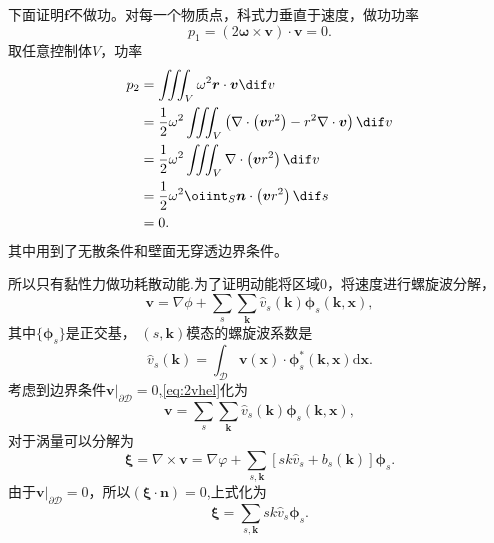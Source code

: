 \documentclass[12pt]{ctexart}
\begin{document}
下面证明$\bm{f}$不做功。对每一个物质点，科式力垂直于速度，做功功率
\begin{equation}
	p_1 = (2 \bm{\omega} \times \bm{v}) \cdot \bm{v} = 0.
\end{equation}
取任意控制体$V$，功率
\begin{equation}
	\begin{aligned}
		p_2 & =  \iiint_V \omega^2\bm{r} \cdot \bm{v} \dif v                                                                          \\
		    & =      \frac{1}{2} \omega^2 \iiint_V \left( \nabla \cdot \left(\bm{v}r^2\right) - r^2 \nabla \cdot \bm{v}\right) \dif v \\
		    & =      \frac{1}{2} \omega^2 \iiint_V \nabla \cdot \left(\bm{v}r^2\right)  \dif v                                        \\
		    & =      \frac{1}{2} \omega^2 \oiint_S \bm{n} \cdot \left(\bm{v}r^2\right)  \dif s                                        \\
		    & =0.
	\end{aligned}
\end{equation}
其中用到了无散条件和壁面无穿透边界条件。

所以只有黏性力做功耗散动能.为了证明动能将区域$0$，将速度进行螺旋波分解，\cite{yang_su_wu_2010}
\begin{equation}
	\bm{v}=\nabla \phi+\sum_{s} \sum_{\bm{k}} \widehat{v}_{s}(\bm{k}) \bm{\phi}_{s}(\bm{k}, \bm{x}),
	\label{eq:2vhel}
\end{equation}
其中$\{\bm{\phi}_{s}\}$是正交基， $(s,\bm{k})$模态的螺旋波系数是
\begin{equation}
	\widehat{v}_{s}(\boldsymbol{k})=\int_{\mathscr{D}} \boldsymbol{v}(\boldsymbol{x}) \cdot \boldsymbol{\phi}_{s}^{*}(\boldsymbol{k}, \boldsymbol{x}) \mathrm{d} \boldsymbol{x}.
\end{equation}
考虑到边界条件$\bm{v}\big|_{\partial \mathscr{D}}=0$,\cref{eq:2vhel}化为
\begin{equation}
	\bm{v}=\sum_{s} \sum_{\bm{k}} \widehat{v}_{s}(\bm{k}) \bm{\phi}_{s}(\bm{k}, \bm{x}),
	\label{eq:2vhel1}
\end{equation}
对于涡量可以分解为
\begin{equation}
	\bm{\xi}=\nabla \times \boldsymbol{v}=\nabla \varphi+\sum_{s, \boldsymbol{k}}\left[s k \widehat{v}_{s}+b_{s}(\boldsymbol{k})\right] \boldsymbol{\phi}_{s}.
\end{equation}
由于$\bm{v}\big|_{\partial \mathscr{D}}=0$，所以$(\bm{\xi}\cdot \bm{n})=0$,上式化为
\begin{equation}
	\bm{\xi}=\sum_{s, \boldsymbol{k}}s k \widehat{v}_{s} \boldsymbol{\phi}_{s}.
\end{equation}
\end{document}

